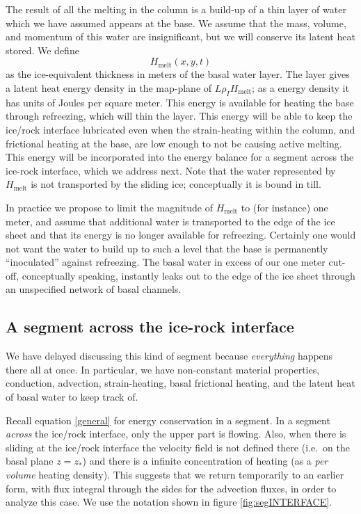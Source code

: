 \documentclass[12pt,final]{amsart}%
\theoremstyle{plain}
\theoremstyle{definition}
\theoremstyle{remark}
\begin{document}
The result of all the melting in the column is a build-up of a thin layer of water which we have assumed appears at the base.  We assume that the mass, volume, and momentum of this water are insignificant, but we will conserve its latent heat stored.  We define
    $$H_{\text{melt}}(x,y,t)$$
as the ice-equivalent thickness in meters of the basal water layer.  The layer gives a latent heat energy density in the map-plane of $L \rho_I H_{\text{melt}}$; as a energy density it has units of Joules per square meter.  This energy is available for heating the base through refreezing, which will thin the layer.  This energy will be able to keep the ice/rock interface lubricated even when the strain-heating within the column, and frictional heating at the base, are low enough to not be causing active melting.  This energy will be incorporated into the energy balance for a segment across the ice-rock interface, which we address next.  Note that the water represented by $H_{\text{melt}}$ is not transported by the sliding ice; conceptually it is bound in till.

In practice we propose to limit the magnitude of $H_{\text{melt}}$ to (for instance) one meter, and assume that additional water is transported to the edge of the ice sheet and that its energy is no longer available for refreezing.  Certainly one would not want the water to build up to such a level that the base is permanently ``inoculated'' against refreezing.  The basal water in excess of our one meter cut-off, conceptually speaking, instantly leaks out to the edge of the ice sheet through an unspecified network of basal channels.


\subsection*{A segment across the ice-rock interface} We have delayed discussing this kind of segment because \emph{everything} happens there all at once.  In particular, we have non-constant material properties, conduction, advection, strain-heating, basal frictional heating, and the latent heat of basal water to keep track of.

Recall equation \eqref{general} for energy conservation in a segment.  In a segment \emph{across} the ice/rock interface, only the upper part is flowing.  Also, when there is sliding at the ice/rock interface the velocity field is not defined there (i.e.~on the basal plane $z=z_\ast$) and there is a infinite concentration of heating (as a \emph{per volume} heating density).  This suggests that we return temporarily to an earlier form, with flux integral through the sides for the advection fluxes, in order to analyze this case.  We use the notation shown in figure \ref{fig:segINTERFACE}.
\end{document}

